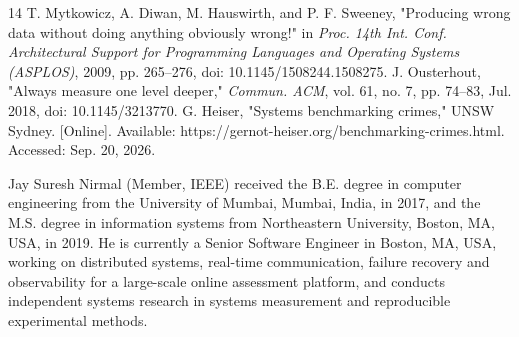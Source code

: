 \documentclass{ieeeaccess}
\begin{document}
\begin{thebibliography}{14}
 T. Mytkowicz, A. Diwan, M. Hauswirth, and P. F. Sweeney, "Producing wrong data without doing anything obviously wrong!" in \textit{Proc. 14th Int. Conf. Architectural Support for Programming Languages and Operating Systems (ASPLOS)}, 2009, pp. 265--276, doi: 10.1145/1508244.1508275.
 J. Ousterhout, "Always measure one level deeper," \textit{Commun. ACM}, vol. 61, no. 7, pp. 74--83, Jul. 2018, doi: 10.1145/3213770.
 G. Heiser, "Systems benchmarking crimes," UNSW Sydney. [Online]. Available: https://gernot-heiser.org/benchmarking-crimes.html. Accessed: Sep. 20, 2026.
\end{thebibliography}

\begin{IEEEbiographynophoto}{Jay Suresh Nirmal}
(Member, IEEE) received the B.E. degree in computer engineering from the University of Mumbai, Mumbai, India, in 2017, and the M.S. degree in information systems from Northeastern University, Boston, MA, USA, in 2019. He is currently a Senior Software Engineer in Boston, MA, USA, working on distributed systems, real-time communication, failure recovery and observability for a large-scale online assessment platform, and conducts independent systems research in systems measurement and reproducible experimental methods.
\end{IEEEbiographynophoto}

\EOD
\end{document}
